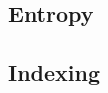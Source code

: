 \documentclass[conference]{IEEEtran}
\newcommand\bashstyle{
	\lstset{
		language=Bash,
		basicstyle=\ttm,
		showstringspaces=false,
		tabsize=2,
		aboveskip=0.2cm,
		belowskip=0.2cm,
		prebreak=\textbackslash,
		extendedchars=true,
		mathescape=false,
		linewidth=8.85cm,
		breaklines=true
	}
}
\newcommand\bashexternal[2][]{{\bashstyle}}
\begin{document}
\subsection{Entropy}

\subsection{Indexing}



\end{document}
